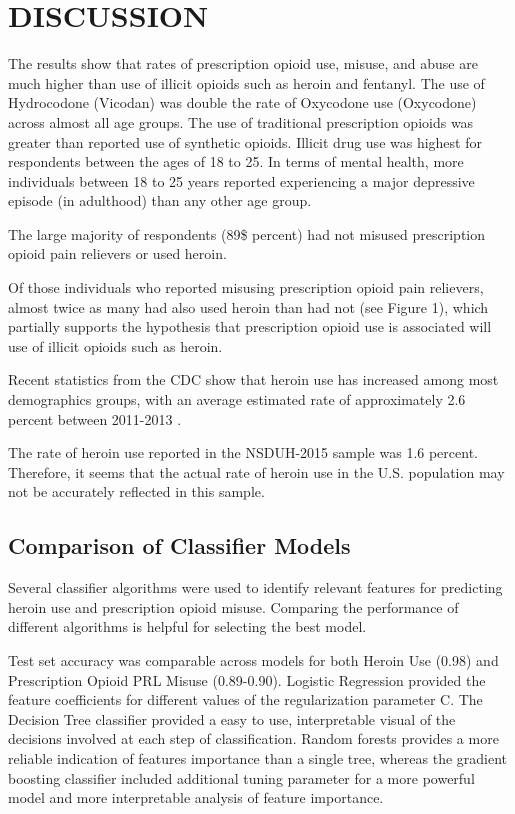 \documentclass[sigconf]{acmart}
\begin{document}
\section{DISCUSSION}


The results show that rates of prescription opioid use, misuse, and abuse are
much higher than use of illicit opioids such as heroin and fentanyl. The use 
of Hydrocodone (Vicodan) was double the rate of Oxycodone use (Oxycodone) 
across almost all age groups. The use of traditional prescription opioids 
was greater than reported use of synthetic opioids. Illicit drug use was 
highest for respondents between the ages of 18 to 25. In terms of mental 
health, more individuals between 18 to 25 years reported experiencing a major 
depressive episode (in adulthood) than any other age group. 

The large majority of respondents (89\$ percent) had not misused 
prescription opioid 
pain relievers or used heroin. 

Of those individuals who reported 
misusing prescription opioid pain relievers, almost twice as many had also
used heroin than had not (see Figure 1), which partially supports the 
hypothesis that prescription opioid use is associated will use of illicit 
opioids such as heroin. 
 
 Recent statistics from the CDC show that heroin use
has increased among most demographics groups, with an average estimated rate 
of approximately 2.6 percent between 2011-2013 \cite{cdc16}.

The rate of heroin use reported in the NSDUH-2015 sample was 1.6 percent. 
Therefore, it seems that the actual rate of heroin use in the U.S. population 
may not be accurately reflected in this sample. 

 

\subsection{Comparison of Classifier Models}

Several classifier algorithms were used to identify relevant features for 
predicting heroin use and prescription opioid misuse. Comparing the performance 
of different algorithms is helpful for  selecting the best model. 

Test set
accuracy was comparable across models for both Heroin Use (0.98) and 
Prescription Opioid PRL Misuse (0.89-0.90). Logistic Regression provided the
feature coefficients for different values of the regularization parameter C. 
The Decision Tree classifier provided a easy to use, interpretable visual of
the decisions involved at each step of classification. Random forests provides
a more reliable indication of features importance than a single tree, 
whereas the gradient boosting classifier included additional tuning 
parameter for a more powerful model and more interpretable analysis of
feature importance. 
\end{document}
